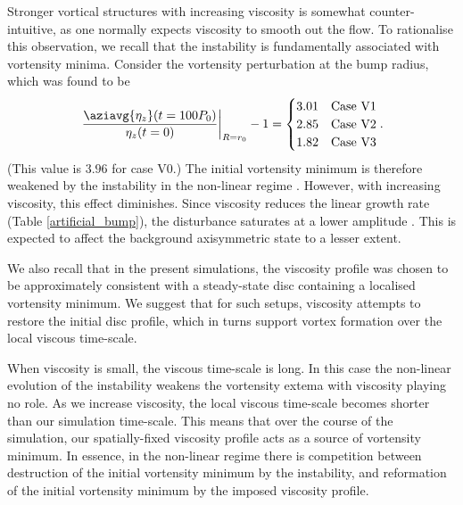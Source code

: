Stronger vortical structures with increasing viscosity is somewhat counter-intuitive, 
as one normally expects viscosity to smooth out the flow. To
rationalise this observation, we recall that the instability is
fundamentally associated with vortensity minima. Consider the
vortensity perturbation at the bump radius, which was found to be 
\begin{align}
  \left.\frac{\aziavg{\eta_z}(t=100P_0)}{\eta_z(t=0)}\right|_{R=r_0} - 1 = 
  \begin{cases}
   3.01  & \text{Case V1} \\
   2.85  & \text{Case V2} \\
   1.82  & \text{Case V3} \\
  \end{cases}.
\end{align} 
(This value is $3.96$ for case V0.) The initial vortensity minimum is
therefore weakened by the instability in the non-linear regime
\citep{meheut10}. However, with increasing viscosity, this effect
diminishes. Since viscosity reduces the linear growth rate (Table
\ref{artificial_bump}), the disturbance saturates at a lower amplitude
\citep{meheut13}. This is expected to affect the background
axisymmetric state to a lesser extent.  

We also recall that in the present simulations, 
the viscosity profile was chosen to be
approximately consistent with a steady-state disc containing a
localised vortensity minimum.  We suggest that for
such setups, viscosity attempts to restore the initial disc profile,
which in turns support vortex formation over the local viscous
time-scale.  


When viscosity is small, the viscous time-scale is long. In this case
the non-linear evolution of the instability weakens the vortensity
extema with viscosity playing no role. 
As we increase viscosity, the local viscous time-scale
becomes shorter than our simulation time-scale. This means that over
the course of the simulation, our spatially-fixed viscosity profile acts
as a source of vortensity minimum. In essence, in the non-linear
regime there is competition
between destruction of the initial vortensity minimum by the 
instability, and reformation of the initial vortensity minimum by the
imposed viscosity profile. 

